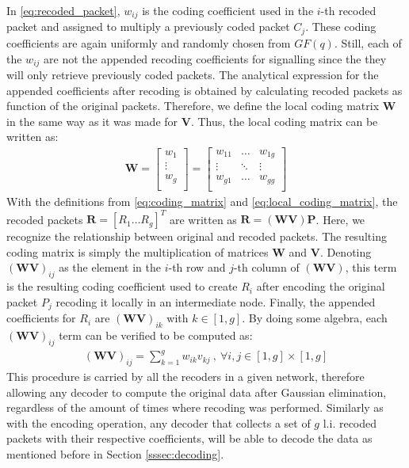 In \eqref{eq:recoded_packet}, $w_{ij}$ is the coding coefficient used
in the $i$-th recoded packet and assigned to multiply a previously coded
packet $C_j$. These coding coefficients are again uniformly and randomly chosen
from $GF(q)$. Still, each of the $w_{ij}$ are not the appended recoding
coefficients for signalling since the they will only retrieve previously
coded packets. The analytical expression for the appended coefficients
after recoding is obtained by calculating recoded packets as function of the
original packets. Therefore, we define the local coding matrix $\textbf{W}$
in the same way as it was made for $\textbf{V}$. Thus, the local coding matrix
can be written as:
%
\begin{align} \label{eq:local_coding_matrix}
\textbf{W} =
\left[
\begin{array}{c}
        w_1    \\ \hline
        \vdots \\ \hline
        w_g    \\
\end{array}
\right]
=
\left[
\begin{array}{ccc}
        w_{11} & \ldots & w_{1g} \\
        \vdots  & \ddots & \vdots  \\
        w_{g1} & \ldots & w_{gg} \\
\end{array}
\right]
\end{align}
%
With the definitions from \eqref{eq:coding_matrix} and
\eqref{eq:local_coding_matrix}, the recoded packets
$\textbf{R} = \left[R_1 \ldots R_g \right]^T$ are written as
$\textbf{R} = (\textbf{W} \textbf{V}) \textbf{P}$. Here, we recognize
the relationship between original and recoded packets. The resulting
coding matrix is simply the multiplication of matrices $\textbf{W}$ and
$\textbf{V}$. Denoting ${(\textbf{W} \textbf{V})}_{ij}$ as the element
in the $i$-th row and $j$-th column of $(\textbf{W} \textbf{V})$, this
term is the resulting coding coefficient used to create $R_i$ after
encoding the original packet $P_j$ recoding it locally in an intermediate
node. Finally, the appended coefficients for $R_i$ are
${(\textbf{W} \textbf{V})}_{ik}$ with $k \in [1,g]$. By doing some
algebra, each ${(\textbf{W} \textbf{V})}_{ij}$ term can be verified to be
computed as:
%
\begin{align}
\label{eq:appended_coded_coefficients}
{(\textbf{W} \textbf{V})}_{ij} = \sum_{k=1}^{g} w_{ik} v_{kj}\ ,\ \forall i,j \in [1,g] \times [1,g]
\end{align}
%
This procedure is carried by all the recoders in a given network, therefore
allowing any decoder to compute the original data after Gaussian elimination,
regardless of the amount of times where recoding was performed. Similarly
as with the encoding operation, any decoder that collects a set of
$g$ \ac{l.i.} recoded packets with their respective coefficients, will
be able to decode the data as mentioned before in Section \ref{sssec:decoding}.


